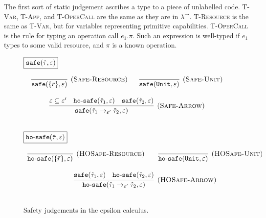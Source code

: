 \noindent

\noindent
The first sort of static judgement ascribes a type to a piece of unlabelled code. \textsc{T-Var}, \textsc{T-App}, and \textsc{T-OperCall} are the same as they are in $\lambda^{\rightarrow}$. \textsc{T-Resource} is the same as \textsc{T-Var}, but for variables representing primitive capabilities. \textsc{T-OperCall} is the rule for typing an operation call $e_1.\pi$. Such an expression is well-typed if $e_1$ types to some valid resource, and $\pi$ is a known operation.


\begin{figure}[h]

\noindent
$\fbox{$\mathtt{safe(\hat \tau, \varepsilon)}$}$

\[
\begin{array}{c}

\infer[\textsc{(Safe-Resource)}]
	{\kwa{safe}(\{ \bar r \}, \varepsilon)}
	{}
~~~~~
\infer[\textsc{(Safe-Unit)}]
	{\kwa{safe}(\kwa{Unit}, \varepsilon)}
	{} \\[3ex]

\infer[\textsc{(Safe-Arrow)}]
	{\kwa{safe}(\hat \tau_1 \rightarrow_{\varepsilon'} \hat \tau_2, \varepsilon)}
	{\varepsilon \subseteq \varepsilon' & \kwa{ho \hyphen safe}(\hat \tau_1, \varepsilon) & \kwa{safe}(\hat \tau_2, \varepsilon)} \\[3ex]

\end{array}
\]

\noindent
$\fbox{$\mathtt{ho \hbox{-} safe(\hat \tau, \varepsilon)}$}$

\[
\begin{array}{c}

\infer[\textsc{(HOSafe-Resource)}]
	{ \kwa{ho \hyphen safe}( \{ \bar r \}, \varepsilon)} 
	{}
	~~~~~~
\infer[\textsc{(HOSafe-Unit)}]
	{ \kwa{ho \hyphen safe}( \kwa{Unit}, \varepsilon)} 
	{}\\[3ex]

\infer[\textsc{(HOSafe-Arrow)}]
	{ \kwa{ho \hyphen safe}( \hat \tau_1 \rightarrow_{\varepsilon'} \hat \tau_2, \varepsilon ) }
	{ \kwa{safe}(\hat \tau_1, \varepsilon)  & \kwa{ho \hyphen safe}(\hat \tau_2, \varepsilon) }\\[3ex]

\end{array}
\]

\vspace{-7pt}
\caption{Safety judgements in the epsilon calculus.}
\label{This is the label.}
\end{figure}

